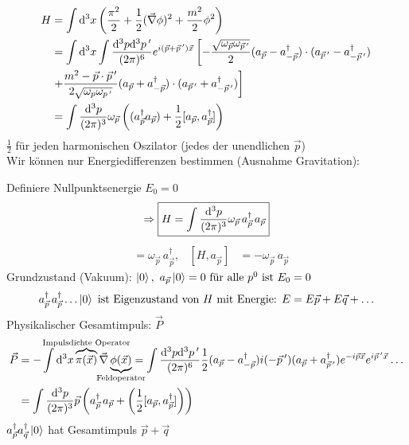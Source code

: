 	\begin{align*}
		H &= \int \mathrm{d}^3 x 
		\left(
			\frac{\pi^2}{2} + \frac{1}{2} (\vec{\nabla} \phi)^2 + \frac{m^2}{2} \phi^2
		\right) \\
		&= \int \mathrm{d}^3 x \int \frac{\mathrm{d}^3 p \mathrm{d}^3 p\,'}{(2\pi)^6} e^{i (\vec{p} + \vec{p}\,')\vec{x}} 
		\left[
			- \frac{\sqrt{\omega_{\vec{p}} \omega_{\vec{p}\,'}}}{2} 
			(a_{\vec{p}} - a_{-\vec{p}}^\dagger) \cdot (a_{\vec{p}\,'} - a_{-\vec{p}\,'}^\dagger)
		\right.\\
		&\left.
			+ \frac{m^2 - \vec{p} \cdot \vec{p}\,'}{2\sqrt{\omega_p \omega_{p\,'}}}
			(a_{\vec{p}} + a_{-\vec{p}}^\dagger) \cdot (a_{\vec{p}\,'} + a_{-\vec{p}\,'}^\dagger)
		\right] \\
		&= \int \frac{\mathrm{d}^3 p}{(2 \pi)^3} \omega_{\vec{p}} 
		\left(
			(a^\dagger_{\vec{p}} a_{\vec{p}}) + \frac{1}{2} [a_{\vec{p}}, a^\dagger_{\vec{p}}]
		\right)
	\end{align*}
$\frac{1}{2}$ für jeden harmonischen Oszilator (jedes der unendlichen $\vec{p}$)
\\ 
Wir können nur Energiedifferenzen bestimmen (Ausnahme Gravitation):
 
Definiere Nullpunktsenergie $E_0 = 0$
	\begin{align*}
		\Rightarrow \boxed{H = \int \frac{\mathrm{d}^3 p}{(2 \pi)^3} \omega_{\vec{p}}\, a_{\vec{p}}^\dagger \,a_{\vec{p}}}
	\end{align*}
	\begin{align*}
		[H, a_{\vec{p}}^\dagger] &= \omega_{\vec{p}}\, a_{\vec{p}}^\dagger ,&
		[H, a_{\vec{p}}] &= - \omega_{\vec{p}} \,a_{\vec{p}}
	\end{align*}
Grundzustand (Vakuum): 
$\ket{0}, ~a_{\vec{p}}\ket{0} = 0 ~\text{für alle }p^0 \text{ ist }E_0 = 0$
	\begin{align*}
		a_{\vec{p}}^\dagger \,a_{\vec{p}}^\dagger \ldots \ket{0} \text{ ist Eigenzustand von } H \text{ mit Energie: }  E= E\vec{p} + E\vec{q} + \ldots
	\end{align*}
Physikalischer Gesamtimpuls: $\vec{P}$
	\begin{align*}
		\vec{P} &= - \int \diff^3 x \overbrace{\pi (\vec{x})}^{\mathclap{\text{Impulsdichte Operator}}} \vec{\nabla} \underbrace{\phi(\vec{x})}_{\mathclap{\text{Feldoperator}}}
		= \int \frac{\diff^3 p \diff^3 p\,'}{(2\pi)^6} \frac{1}{2} (a_{\vec{p}} - a_{-\vec{p}}^\dagger) i (- \vec{p}\,') (a_{\vec{p}} + a_{\vec{p}\,'}^\dagger) e^{-i\vec{p} \vec{x}} e^{i \vec{p}\,' \vec{x}} \ldots \\
		&= \int \frac{\diff^3 p}{(2\pi)^3} \vec{p} 
		\left(
			a_{\vec{p}}^\dagger \,a_{\vec{p}} + \left(\frac{1}{2} [a_{\vec{p}}, a_{\vec{p}}^\dagger] \right)
		\right)
	\end{align*}
$a_{\vec{p}}^\dagger a_{\vec{q}}^\dagger \ket{0}$ hat Gesamtimpuls $\vec{p} + \vec{q}$

